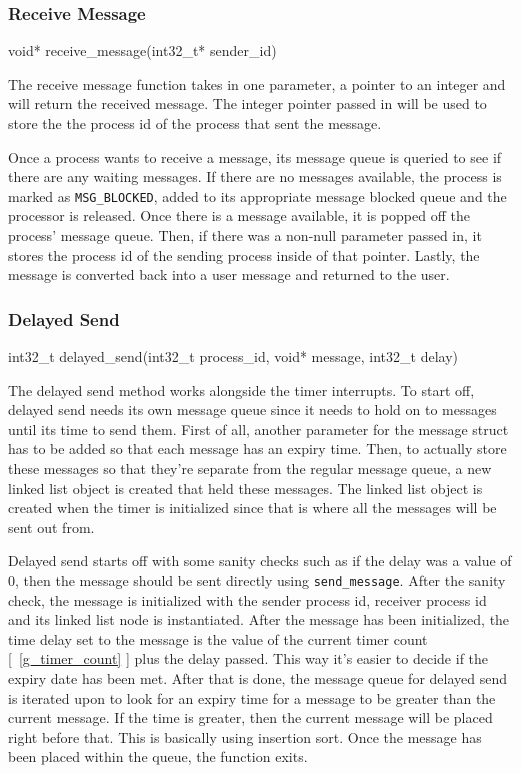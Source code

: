 \documentclass[se]{uw-wkrpt}
\begin{document}
\subsubsection{Receive Message}

\begin{code}
void* receive_message(int32_t* sender_id)
\end{code}

The receive message function takes in one parameter, a pointer to an integer and will return the received message. The integer pointer passed in will be used to store the the process id of the process that sent the message. 

Once a process wants to receive a message, its message queue is queried to see if there are any waiting messages. If there are no messages available, the process is marked as \texttt{MSG\_BLOCKED}, added to its appropriate message blocked queue and the processor is released. Once there is a message available, it is popped off the process' message queue. Then, if there was a non-null parameter passed in, it stores the process id of the sending process inside of that pointer. Lastly, the message is converted back into a user message and returned to the user.

\subsubsection{Delayed Send}

\begin{code}
int32_t delayed_send(int32_t process_id, void* message, int32_t delay)
\end{code}

The delayed send method works alongside the timer interrupts. To start off, delayed send needs its own message queue since it needs to hold on to messages until its time to send them. First of all, another parameter for the message struct has to be added so that each message has an expiry time. Then, to actually store these messages so that they're separate from the regular message queue, a new linked list object is created that held these messages. The linked list object is created when the timer is initialized since that is where all the messages will be sent out from.

Delayed send starts off with some sanity checks such as if the delay was a value of 0, then the message should be sent directly using \texttt{send\_message}. After the sanity check, the message is initialized with the sender process id, receiver process id and its linked list node is instantiated. After the message has been initialized, the time delay set to the message is the value of the current timer count [~\ref{g_timer_count} ] plus the delay passed. This way it's easier to decide if the expiry date has been met. After that is done, the message queue for delayed send is iterated upon to look for an expiry time for a message to be greater than the current message. If the time is greater, then the current message will be placed right before that. This is basically using insertion sort. Once the message has been placed within the queue, the function exits. 
\end{document}
